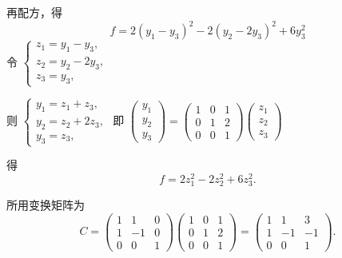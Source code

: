 \documentclass[13pt]{beamer}
\begin{document}
\begin{frame}
再配方，得
\[
f=2\left(y_{1}-y_{3}\right)^{2}-2\left(y_{2}-2 y_{3}\right)^{2}+6 y_{3}^{2} 
\]
令 
$\left\{\begin{array}{l}
z_{1}=y_{1}-y_{3}, \\
z_{2}=y_{2}-2 y_{3}, \\
z_{3}=y_{3},
\end{array}\right. $

则 
$\left\{ \begin{array}{l}
y_{1}=z_{1}+z_{3}, \\
y_{2}=z_{2}+2 z_{3}, \\
y_{3}=z_{3},
\end{array}\right.$
即
$\left(\begin{array}{l}
y_{1} \\
y_{2} \\
y_{3}
\end{array}\right)=\left(\begin{array}{rrr}
1 & 0 & 1 \\
0 & 1 & 2 \\
0 & 0 & 1
\end{array}\right)\left(\begin{array}{l}
z_{1} \\
z_{2} \\
z_{3}
\end{array}\right)$

得 $$ f=2 z_{1}^{2}-2 z_{2}^{2}+6 z_{3}^{2}.$$


所用变换矩阵为
\[
C=\left(\begin{array}{ccc}
1 & 1 & 0 \\
1 & -1 & 0 \\
0 & 0 & 1
\end{array}\right)\left(\begin{array}{ccc}
1 & 0 & 1 \\
0 & 1 & 2 \\
0 & 0 & 1
\end{array}\right)=\left(\begin{array}{ccc}
1 & 1 & 3 \\
1 & -1 & -1 \\
0 & 0 & 1
\end{array}\right).
\]
\end{frame}
\end{document}
